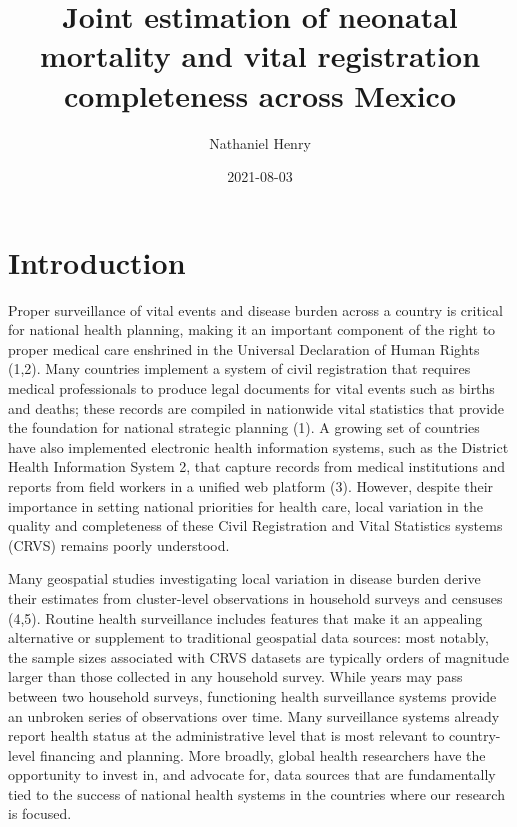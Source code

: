 \documentclass[
]{article}
\title{Joint estimation of neonatal mortality and vital registration completeness across Mexico}
\author{Nathaniel Henry\textsuperscript{}}
\date{2021-08-03}
\begin{document}
\maketitle

\hypertarget{introduction}{%
\section{Introduction}\label{introduction}}

Proper surveillance of vital events and disease burden across a country is critical for national health planning, making it an important component of the right to proper medical care enshrined in the Universal Declaration of Human Rights (1,2). Many countries implement a system of civil registration that requires medical professionals to produce legal documents for vital events such as births and deaths; these records are compiled in nationwide vital statistics that provide the foundation for national strategic planning (1). A growing set of countries have also implemented electronic health information systems, such as the District Health Information System 2, that capture records from medical institutions and reports from field workers in a unified web platform (3). However, despite their importance in setting national priorities for health care, local variation in the quality and completeness of these Civil Registration and Vital Statistics systems (CRVS) remains poorly understood.

Many geospatial studies investigating local variation in disease burden derive their estimates from cluster-level observations in household surveys and censuses (4,5). Routine health surveillance includes features that make it an appealing alternative or supplement to traditional geospatial data sources: most notably, the sample sizes associated with CRVS datasets are typically orders of magnitude larger than those collected in any household survey. While years may pass between two household surveys, functioning health surveillance systems provide an unbroken series of observations over time. Many surveillance systems already report health status at the administrative level that is most relevant to country-level financing and planning. More broadly, global health researchers have the opportunity to invest in, and advocate for, data sources that are fundamentally tied to the success of national health systems in the countries where our research is focused.
\end{document}
